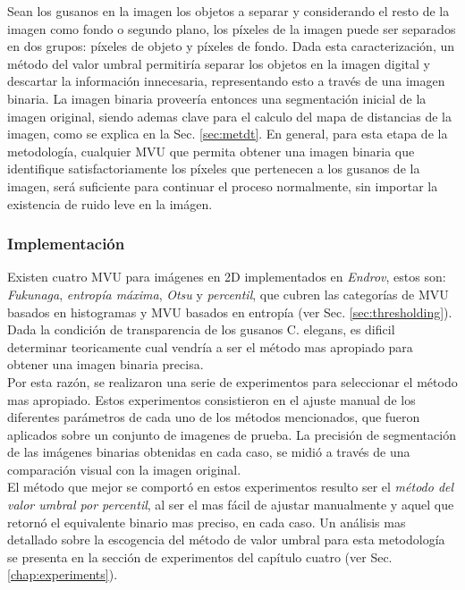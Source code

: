 Sean los gusanos en la imagen los objetos a separar y considerando el resto de la imagen
como fondo o segundo plano, los p\'ixeles de la imagen puede ser separados en dos grupos: 
p\'ixeles de objeto y p\'ixeles de fondo. Dada esta caracterizaci\'on, un m\'etodo del valor
umbral permitir\'ia separar los objetos en la imagen digital y descartar la informaci\'on
innecesaria, representando esto a trav\'es de una imagen binaria. La imagen binaria proveer\'ia
entonces una segmentaci\'on inicial de la imagen original, siendo ademas clave para el
calculo del mapa de distancias de la imagen, como se explica en la Sec. \ref{sec:metdt}.
En general, para esta etapa de la metodolog\'ia, cualquier MVU que permita obtener una imagen
binaria que identifique satisfactoriamente los p\'ixeles que pertenecen a los gusanos de la
imagen, ser\'a suficiente para continuar el proceso normalmente, sin importar la existencia
de ruido leve en la im\'agen.


\subsubsection*{Implementaci\'on}
\label{sec:thresimp}

Existen cuatro MVU para im\'agenes en 2D implementados en \emph{Endrov},
estos son: \emph{Fukunaga}, \emph{entrop\'ia m\'axima}, \emph{Otsu} y \emph{percentil},
que cubren las categor\'ias de MVU basados en histogramas y MVU basados en entrop\'ia 
(ver Sec. \ref{sec:thresholding}). Dada la condici\'on de transparencia de los gusanos
C. elegans, es dificil determinar teoricamente cual vendr\'ia a ser el m\'etodo mas apropiado 
para obtener una imagen binaria precisa. \\
Por esta raz\'on, se realizaron una serie de experimentos
para seleccionar el m\'etodo mas apropiado. Estos experimentos consistieron en el ajuste manual
de los diferentes par\'ametros de cada uno de los m\'etodos mencionados, que fueron aplicados
sobre un conjunto de imagenes de prueba. La precisi\'on de segmentaci\'on de las im\'agenes binarias
obtenidas en cada caso, se midi\'o a trav\'es de una comparaci\'on visual con la imagen original.\\
El m\'etodo que mejor se comport\'o en estos experimentos resulto ser el 
\emph{m\'etodo del valor umbral por percentil}, 
al ser el mas f\'acil de ajustar manualmente y aquel que retorn\'o el equivalente binario mas preciso, 
en cada caso. Un an\'alisis mas detallado sobre la escogencia del m\'etodo de valor umbral para esta metodolog\'ia
se presenta en la secci\'on de experimentos del cap\'itulo cuatro (ver Sec. \ref{chap:experiments}).\\

